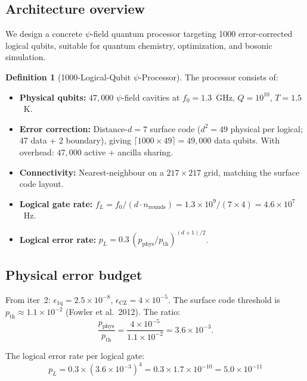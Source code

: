 \documentclass[11pt]{article}
\theoremstyle{definition}
\newtheorem{definition}[theorem]{Definition}
\theoremstyle{remark}
\begin{document}
\subsection{Architecture overview}

We design a concrete $\psi$-field quantum processor targeting 1000
error-corrected logical qubits, suitable for quantum chemistry,
optimization, and bosonic simulation.

\begin{definition}[1000-Logical-Qubit $\psi$-Processor]
\label{def:processor}
The processor consists of:
\begin{itemize}[nosep]
\item \textbf{Physical qubits:} $47{,}000$ $\psi$-field cavities at
$f_0 = 1.3$~GHz, $Q = 10^{10}$, $T = 1.5$~K.
\item \textbf{Error correction:} Distance-$d=7$ surface code
($d^2 = 49$ physical per logical; 47 data + 2 boundary), giving
$\lceil 1000\times49 \rceil = 49{,}000$ data qubits.
With overhead: $47{,}000$ active + ancilla sharing.
\item \textbf{Connectivity:} Nearest-neighbour on a $217\times217$ grid,
matching the surface code layout.
\item \textbf{Logical gate rate:} $f_L = f_0/(d\cdot n_{\mathrm{rounds}})
= 1.3\times10^9/(7\times4) = 4.6\times10^7$~Hz.
\item \textbf{Logical error rate:} $p_L = 0.3\,(p_{\mathrm{phys}}/p_{\mathrm{th}})^{(d+1)/2}$.
\end{itemize}
\end{definition}

\subsection{Physical error budget}

From iter~2: $\epsilon_{\mathrm{1q}} = 2.5\times10^{-8}$,
$\epsilon_{\mathrm{CZ}} = 4\times10^{-5}$. The surface code threshold
is $p_{\mathrm{th}} \approx 1.1\times10^{-2}$ (Fowler et al.\ 2012).
The ratio:
\begin{equation}
\frac{p_{\mathrm{phys}}}{p_{\mathrm{th}}} = \frac{4\times10^{-5}}{1.1\times10^{-2}}
= 3.6\times10^{-3}.
\end{equation}

The logical error rate per logical gate:
\begin{equation}
\boxed{
p_L = 0.3\times(3.6\times10^{-3})^4 = 0.3\times1.7\times10^{-10}
= 5.0\times10^{-11}
}
\label{eq:logical-error}
\end{equation}
\end{document}
